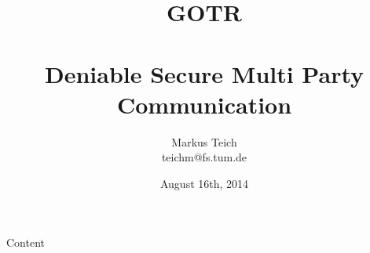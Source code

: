 

\title[Group OTR]{GOTR\\\ \\\normalsize Deniable Secure Multi Party Communication}
\author[Markus Teich, Jannik Theiß]{Markus Teich\\\scriptsize teichm@fs.tum.de}
\date{August 16th, 2014}


\begin{frame}{}
    \titlepage
\end{frame}

\begin{frame}{Content}
    \tableofcontents
\end{frame}








